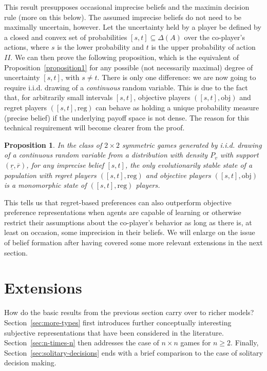 \documentclass[fleqn,reqno,12pt]{article}
\theoremstyle{Satz}
\newtheorem{proposition}{Proposition}
\theoremstyle{Bsp}
\begin{document}
This result presupposes occasional imprecise beliefs and the maximin decision rule (more on
this below). The assumed imprecise beliefs do not need to be maximally uncertain, however.  Let
the uncertainty held by a player be defined by a closed and convex set of probabilities
$ [s,t] \subseteq \Delta(A) $ over the co-player's actions, where $s$ is the lower probability
and $t$ is the upper probability of action $II$.  We can then prove the following proposition,
which is the equivalent of Proposition~\ref{proposition1} for any possible (not necessarily
maximal) degree of uncertainty $[s,t]$, with $s \neq t$. There is only one difference: we are
now going to require i.i.d. drawing of a \emph{continuous} random variable. This is due to the
fact that, for arbitrarily small intervals $[s,t]$, objective players $([s,t],\text{obj})$ and
regret players $([s,t],\text{reg})$ can behave as holding a unique probability measure (precise
belief) if the underlying payoff space is not dense. The reason for this technical requirement
will become clearer from the proof.

\begin{proposition} \label{proposition2} In the class of $2\times2$ symmetric games generated
  by i.i.d. drawing of a continuous random variable from a distribution with density $P_v$ with
  support $(\underline{r},\overline{r})$, for any imprecise
  belief $[s,t]$, the only evolutionarily stable state of a population with regret players
  $([s,t],\text{reg})$ and objective players $([s,t],\text{obj})$ is a monomorphic state of
  $([s,t],\text{reg})$ players.
\end{proposition}

This tells us that regret-based preferences can also outperform objective preference
representations when agents are capable of learning or otherwise restrict their assumptions
about the co-player's behavior as long as there is, at least on occasion, some imprecision in
their beliefs. We will enlarge on the issue of belief formation after having covered some more
relevant extensions in the next section.

\section{Extensions}
\label{sec:extensions}

How do the basic results from the previous section carry over to richer models?
Section~\ref{sec:more-types} first introduces further conceptually interesting subjective
representations that have been considered in the literature. Section~\ref{sec:n-times-n} then
addresses the case of $n \times n$ games for $n \ge 2$. Finally,
Section~\ref{sec:solitary-decisions} ends with a brief comparison to the case of solitary
decision making.
\end{document}
